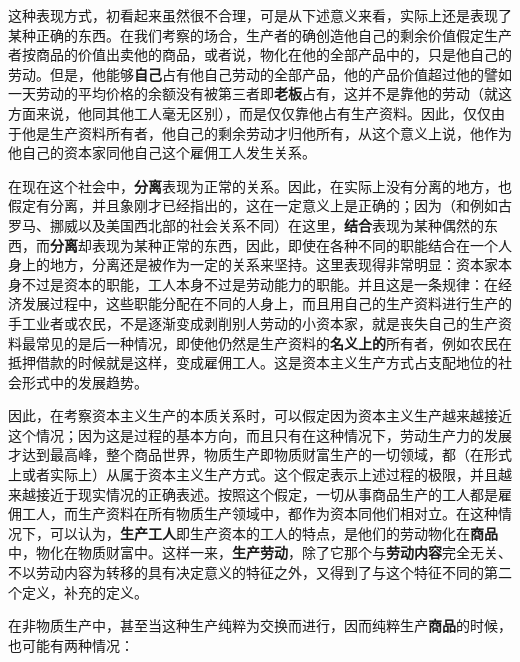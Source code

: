 这种表现方式，初看起来虽然很不合理，可是从下述意义来看，实际上还是表现了某种正确的东西。在我们考察的场合，生产者的确创造他自己的剩余价值\fontbox{~\{}假定生产者按商品的价值出卖他的商品\fontbox{\}~}，或者说，物化在他的全部产品中的，只是他自己的劳动。但是，他能够\textbf{自己}占有他自己劳动的全部产品，他的产品价值超过他的譬如一天劳动的平均价格的余额没有被第三者即\textbf{老板}占有，这并不是靠他的劳动（就这方面来说，他同其他工人毫无区别），而是仅仅靠他占有生产资料。因此，仅仅由于他是生产资料所有者，他自己的剩余劳动才归他所有，从这个意义上说，他作为他自己的资本家同他自己这个雇佣工人发生关系。

在现在这个社会中，\textbf{分离}表现为正常的关系。因此，在实际上没有分离的地方，也假定有分离，并且象刚才已经指出的，这在一定意义上是正确的；因为（和例如古罗马、挪威以及美国西北部的社会关系不同）在这里，\textbf{结合}表现为某种偶然的东西，而\textbf{分离}却表现为某种正常的东西，因此，即使在各种不同的职能结合在一个人身上的地方，分离还是被作为一定的关系来坚持。这里表现得非常明显：资本家本身不过是资本的职能，工人本身不过是劳动能力的职能。并且这是一条规律：在经济发展过程中，这些职能分配在不同的人身上，而且用自己的生产资料进行生产的手工业者或农民，不是逐渐变成剥削别人劳动的小资本家，就是丧失自己的生产资料\fontbox{~\{}最常见的是后一种情况，即使他仍然是生产资料的\textbf{名义上的}所有者，例如农民在抵押借款的时候就是这样\fontbox{\}~}，变成雇佣工人。这是资本主义生产方式占支配地位的社会形式中的发展趋势。


因此，在考察资本主义生产的本质关系时，可以假定\fontbox{~\{}因为资本主义生产越来越接近这个情况；因为这是过程的基本方向，而且只有在这种情况下，劳动生产力的发展才达到最高峰\fontbox{\}~}，整个商品世界，物质生产即物质财富生产的一切领域，都（在形式上或者实际上）从属于资本主义生产方式。这个假定表示上述过程的极限，并且越来越接近于现实情况的正确表述。按照这个假定，一切从事商品生产的工人都是雇佣工人，而生产资料在所有物质生产领域中，都作为资本同他们相对立。在这种情况下，可以认为，\textbf{生产工人}即生产资本的工人的特点，是他们的劳动物化在\textbf{商品}中，物化在物质财富中。这样一来，\textbf{生产劳动}，除了它那个与\textbf{劳动内容}完全无关、不以劳动内容为转移的具有决定意义的特征之外，又得到了与这个特征不同的第二个定义，补充的定义。


在非物质生产中，甚至当这种生产纯粹为交换而进行，因而纯粹生产\textbf{商品}的时候，也可能有两种情况：

